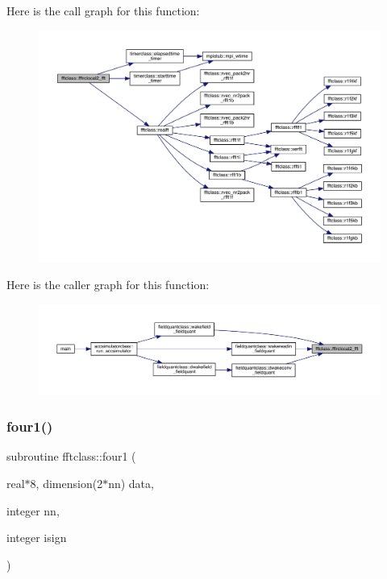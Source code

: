 Here is the call graph for this function\+:\nopagebreak
\begin{figure}[H]
\begin{center}
\leavevmode
\includegraphics[width=350pt]{namespacefftclass_a83a1c8ccf853ae07fdfc5a80e1e244d1_cgraph}
\end{center}
\end{figure}
Here is the caller graph for this function\+:\nopagebreak
\begin{figure}[H]
\begin{center}
\leavevmode
\includegraphics[width=350pt]{namespacefftclass_a83a1c8ccf853ae07fdfc5a80e1e244d1_icgraph}
\end{center}
\end{figure}
\mbox{\label{namespacefftclass_a4597d420a1363f9fd0b652472d7caf52}} 
\subsubsection{\texorpdfstring{four1()}{four1()}}
{\footnotesize\ttfamily subroutine fftclass\+::four1 (\begin{DoxyParamCaption}\item[{real$\ast$8, dimension(2$\ast$nn)}]{data,  }\item[{integer}]{nn,  }\item[{integer}]{isign }\end{DoxyParamCaption})}

